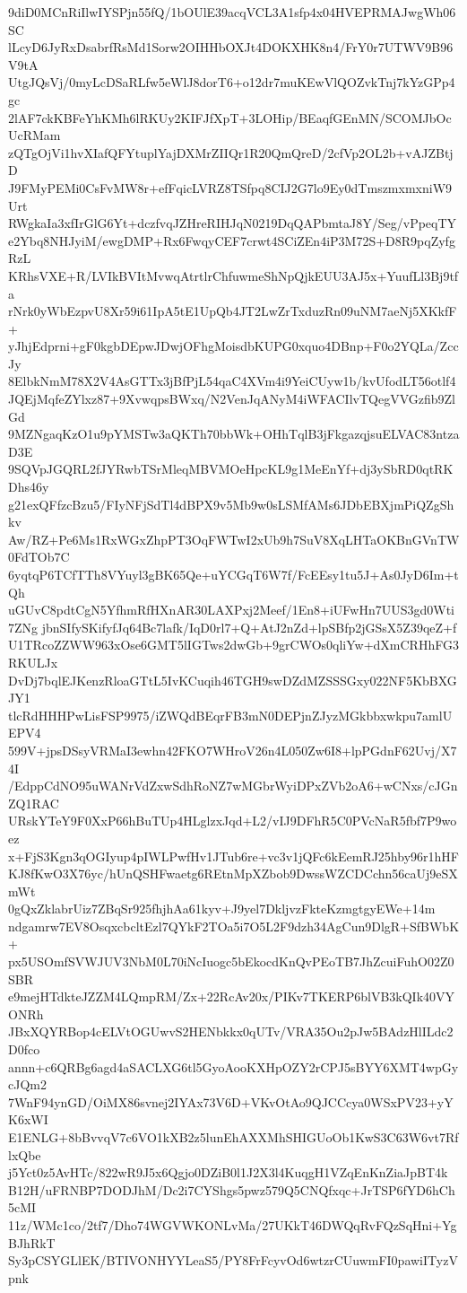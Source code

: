 9diD0MCnRiIlwIYSPjn55fQ/1bOUlE39acqVCL3A1sfp4x04HVEPRMAJwgWh06SC
lLcyD6JyRxDsabrfRsMd1Sorw2OIHHbOXJt4DOKXHK8n4/FrY0r7UTWV9B96V9tA
UtgJQsVj/0myLcDSaRLfw5eWlJ8dorT6+o12dr7muKEwVlQOZvkTnj7kYzGPp4gc
2lAF7ckKBFeYhKMh6lRKUy2KIFJfXpT+3LOHip/BEaqfGEnMN/SCOMJbOcUcRMam
zQTgOjVi1hvXIafQFYtuplYajDXMrZIIQr1R20QmQreD/2cfVp2OL2b+vAJZBtjD
J9FMyPEMi0CsFvMW8r+efFqicLVRZ8TSfpq8CIJ2G7lo9Ey0dTmszmxmxniW9Urt
RWgkaIa3xfIrGlG6Yt+dczfvqJZHreRIHJqN0219DqQAPbmtaJ8Y/Seg/vPpeqTY
e2Ybq8NHJyiM/ewgDMP+Rx6FwqyCEF7crwt4SCiZEn4iP3M72S+D8R9pqZyfgRzL
KRhsVXE+R/LVIkBVItMvwqAtrtlrChfuwmeShNpQjkEUU3AJ5x+YuufLl3Bj9tfa
rNrk0yWbEzpvU8Xr59i61IpA5tE1UpQb4JT2LwZrTxduzRn09uNM7aeNj5XKkfF+
yJhjEdprni+gF0kgbDEpwJDwjOFhgMoisdbKUPG0xquo4DBnp+F0o2YQLa/ZccJy
8ElbkNmM78X2V4AsGTTx3jBfPjL54qaC4XVm4i9YeiCUyw1b/kvUfodLT56otlf4
JQEjMqfeZYlxz87+9XvwqpsBWxq/N2VenJqANyM4iWFACIlvTQegVVGzfib9ZlGd
9MZNgaqKzO1u9pYMSTw3aQKTh70bbWk+OHhTqlB3jFkgazqjsuELVAC83ntzaD3E
9SQVpJGQRL2fJYRwbTSrMleqMBVMOeHpcKL9g1MeEnYf+dj3ySbRD0qtRKDhs46y
g21exQFfzcBzu5/FIyNFjSdTl4dBPX9v5Mb9w0sLSMfAMs6JDbEBXjmPiQZgShkv
Aw/RZ+Pe6Ms1RxWGxZhpPT3OqFWTwI2xUb9h7SuV8XqLHTaOKBnGVnTW0FdTOb7C
6yqtqP6TCfTTh8VYuyl3gBK65Qe+uYCGqT6W7f/FcEEsy1tu5J+As0JyD6Im+tQh
uGUvC8pdtCgN5YfhmRfHXnAR30LAXPxj2Meef/1En8+iUFwHn7UUS3gd0Wti7ZNg
jbnSIfySKifyfJq64Bc7lafk/IqD0rl7+Q+AtJ2nZd+lpSBfp2jGSsX5Z39qeZ+f
U1TRcoZZWW963xOse6GMT5lIGTws2dwGb+9grCWOs0qliYw+dXmCRHhFG3RKULJx
DvDj7bqlEJKenzRloaGTtL5IvKCuqih46TGH9swDZdMZSSSGxy022NF5KbBXGJY1
tlcRdHHHPwLisFSP9975/iZWQdBEqrFB3mN0DEPjnZJyzMGkbbxwkpu7amlUEPV4
599V+jpsDSsyVRMaI3ewhn42FKO7WHroV26n4L050Zw6I8+lpPGdnF62Uvj/X74I
/EdppCdNO95uWANrVdZxwSdhRoNZ7wMGbrWyiDPxZVb2oA6+wCNxs/cJGnZQ1RAC
URskYTeY9F0XxP66hBuTUp4HLglzxJqd+L2/vIJ9DFhR5C0PVcNaR5fbf7P9woez
x+FjS3Kgn3qOGIyup4pIWLPwfHv1JTub6re+vc3v1jQFc6kEemRJ25hby96r1hHF
KJ8fKwO3X76yc/hUnQSHFwaetg6REtnMpXZbob9DwssWZCDCchn56caUj9eSXmWt
0gQxZklabrUiz7ZBqSr925fhjhAa61kyv+J9yel7DkljvzFkteKzmgtgyEWe+14m
ndgamrw7EV8OsqxcbcltEzl7QYkF2TOa5i7O5L2F9dzh34AgCun9DlgR+SfBWbK+
px5USOmfSVWJUV3NbM0L70iNcIuogc5bEkocdKnQvPEoTB7JhZcuiFuhO02Z0SBR
e9mejHTdkteJZZM4LQmpRM/Zx+22RcAv20x/PIKv7TKERP6blVB3kQIk40VYONRh
JBxXQYRBop4cELVtOGUwvS2HENbkkx0qUTv/VRA35Ou2pJw5BAdzHlILdc2D0fco
annn+c6QRBg6agd4aSACLXG6tl5GyoAooKXHpOZY2rCPJ5sBYY6XMT4wpGycJQm2
7WnF94ynGD/OiMX86svnej2IYAx73V6D+VKvOtAo9QJCCcya0WSxPV23+yYK6xWI
E1ENLG+8bBvvqV7c6VO1kXB2z5lunEhAXXMhSHIGUoOb1KwS3C63W6vt7RflxQbe
j5Yct0z5AvHTc/822wR9J5x6Qgjo0DZiB0l1J2X3l4KuqgH1VZqEnKnZiaJpBT4k
B12H/uFRNBP7DODJhM/Dc2i7CYShgs5pwz579Q5CNQfxqc+JrTSP6fYD6hCh5cMI
11z/WMc1co/2tf7/Dho74WGVWKONLvMa/27UKkT46DWQqRvFQzSqHni+YgBJhRkT
Sy3pCSYGLlEK/BTIVONHYYLeaS5/PY8FrFcyvOd6wtzrCUuwmFI0pawiITyzVpnk
